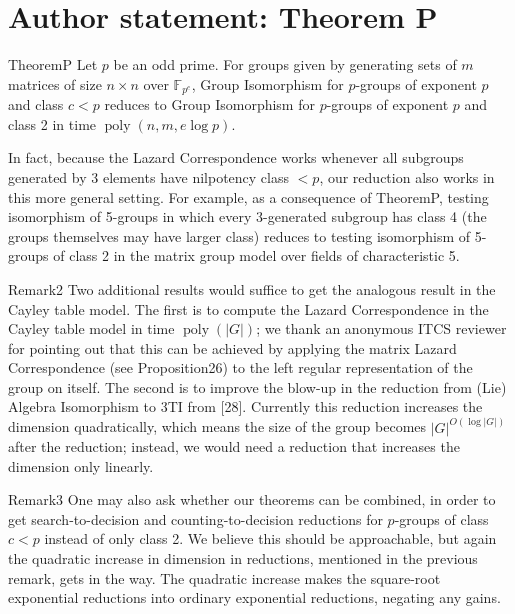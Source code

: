 \section*{Author statement: Theorem P}
\begin{authorclaim}{TheoremP}
Let $p$ be an odd prime. For groups given by generating sets of $m$ matrices of size $n\times n$ over $\mathbb F_{p^e}$, Group Isomorphism for $p$-groups of exponent $p$ and class $c<p$ reduces to Group Isomorphism for $p$-groups of exponent $p$ and class 2 in time $\operatorname{poly}(n,m,e\log p)$.
\end{authorclaim}
In fact, because the Lazard Correspondence works whenever all subgroups generated by 3 elements have nilpotency class $<p$, our reduction also works in this more general setting. For example, as a consequence of TheoremP, testing isomorphism of 5-groups in which every 3-generated subgroup has class 4 (the groups themselves may have larger class) reduces to testing isomorphism of 5-groups of class 2 in the matrix group model over fields of characteristic 5.
\begin{authorclaim}{Remark2}
Two additional results would suffice to get the analogous result in the Cayley table model. The first is to compute the Lazard Correspondence in the Cayley table model in time $\operatorname{poly}(|G|)$; we thank an anonymous ITCS reviewer for pointing out that this can be achieved by applying the matrix Lazard Correspondence (see Proposition26) to the left regular representation of the group on itself. The second is to improve the blow-up in the reduction from (Lie) Algebra Isomorphism to 3TI from [28]. Currently this reduction increases the dimension quadratically, which means the size of the group becomes $|G|^{O(\log|G|)}$ after the reduction; instead, we would need a reduction that increases the dimension only linearly.
\end{authorclaim}
\begin{authorclaim}{Remark3}
One may also ask whether our theorems can be combined, in order to get search-to-decision and counting-to-decision reductions for $p$-groups of class $c<p$ instead of only class 2. We believe this should be approachable, but again the quadratic increase in dimension in reductions, mentioned in the previous remark, gets in the way. The quadratic increase makes the square-root exponential reductions into ordinary exponential reductions, negating any gains.
\end{authorclaim}
